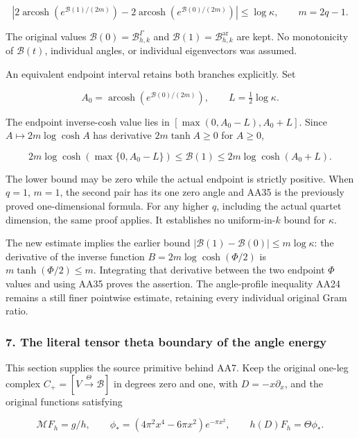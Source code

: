 \documentclass{article}
\begin{document}
\[
\boxed{
\left|2\operatorname{arcosh}(e^{\mathcal B(1)/(2m)})
      -2\operatorname{arcosh}(e^{\mathcal B(0)/(2m)})\right|
\le\log\kappa,
\qquad m=2q-1.
}
\tag{AA35}
\]

The original values \(\mathcal B(0)=\mathcal B^{\Gamma}_{h,k}\) and \(\mathcal B(1)=\mathcal B^{\mathrm{ar}}_{h,k}\) are kept. No monotonicity of \(\mathcal B(t)\), individual angles, or individual eigenvectors was assumed.

An equivalent endpoint interval retains both branches explicitly. Set

\[
A_0=\operatorname{arcosh}(e^{\mathcal B(0)/(2m)}),\qquad
L=\tfrac12\log\kappa.
\tag{AA36}
\]

The endpoint inverse-cosh value lies in \([\max(0,A_0-L),A_0+L]\). Since \(A\mapsto2m\log\cosh A\) has derivative \(2m\tanh A\ge0\) for \(A\ge0\),

\[
\boxed{
2m\log\cosh(\max\{0,A_0-L\})
\le\mathcal B(1)\le2m\log\cosh(A_0+L).
}
\tag{AA37}
\]

The lower bound may be zero while the actual endpoint is strictly positive. When \(q=1\), \(m=1\), the second pair has its one zero angle and AA35 is the previously proved one-dimensional formula. For any higher \(q\), including the actual quartet dimension, the same proof applies. It establishes no uniform-in-\(k\) bound for \(\kappa\).

The new estimate implies the earlier bound \(|\mathcal B(1)-\mathcal B(0)|\le m\log\kappa\): the derivative of the inverse function \(B=2m\log\cosh(\Phi/2)\) is \(m\tanh(\Phi/2)\le m\). Integrating that derivative between the two endpoint \(\Phi\) values and using AA35 proves the assertion. The angle-profile inequality AA24 remains a still finer pointwise estimate, retaining every individual original Gram ratio.

\subsubsection{7. The literal tensor theta boundary of the angle energy}\label{endpoint-all_degree_angle_review--the-literal-tensor-theta-boundary-of-the-angle-energy}

This section supplies the source primitive behind AA7. Keep the original one-leg complex \(C_+=[V\xrightarrow{\Theta}\mathscr B]\) in degrees zero and one, with \(D=-x\partial_x\), and the original functions satisfying

\[
\mathcal MF_h=g/h,\qquad
\phi_*=(4\pi^2x^4-6\pi x^2)e^{-\pi x^2},\qquad
h(D)F_h=\Theta\phi_*.
\tag{AA38}
\]
\end{document}
